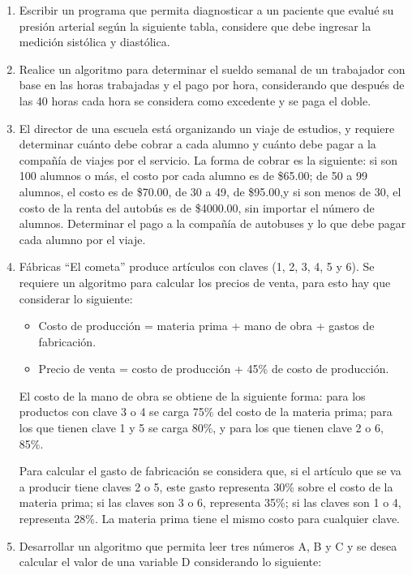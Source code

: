\documentclass{scrartcl}
\begin{document}
\begin{enumerate}
		\item Escribir un programa que permita diagnosticar a un paciente que evalué su presión arterial según la siguiente tabla, considere que debe ingresar la medición sistólica y diastólica.
		
		\item Realice un algoritmo para determinar el sueldo semanal de un trabajador con base en las horas trabajadas y el pago por hora, considerando que después de las 40 horas cada hora se considera como excedente y se paga el doble.
		
		\item El director de una escuela está organizando un viaje de estudios, y requiere determinar cuánto debe cobrar a cada alumno y cuánto debe pagar a la compañía de viajes por el servicio. La forma de cobrar es la siguiente: si son 100 alumnos o más, el costo por cada alumno es de \$65.00; de 50 a 99 alumnos, el costo es de \$70.00, de 30 a 49, de \$95.00,y si son menos de 30, el costo de la renta del autobús es de \$4000.00, sin importar el número de alumnos. Determinar el pago a la compañía de autobuses y lo que debe pagar cada alumno por el viaje.
				
		\item Fábricas “El cometa” produce artículos con claves (1, 2, 3, 4, 5 y 6). Se requiere un algoritmo para calcular los precios de venta, para esto hay que considerar lo siguiente:
		
			\begin{itemize}
				\item Costo de producción = materia prima + mano de obra + gastos de fabricación.
				\item Precio de venta = costo de producción + 45\% de costo de producción.
			\end{itemize}
		
		El costo de la mano de obra se obtiene de la siguiente forma: para los productos con clave 3 o 4 se carga 75\% del costo de la materia prima; para los que tienen clave 1 y 5 se carga 80\%, y para los que tienen clave 2 o 6, 85\%.
		
		Para calcular el gasto de fabricación se considera que, si el artículo que se va a producir tiene claves 2 o 5, este gasto representa 30\% sobre el costo de la materia prima; si las claves son 3 o 6, representa 35\%; si las claves son 1 o 4, representa 28\%. La materia prima tiene el mismo costo para cualquier clave.
		
		\item Desarrollar un algoritmo que permita leer tres números A, B y C y se desea calcular el valor de una variable D considerando lo siguiente:
		

\end{enumerate}
\end{document}
